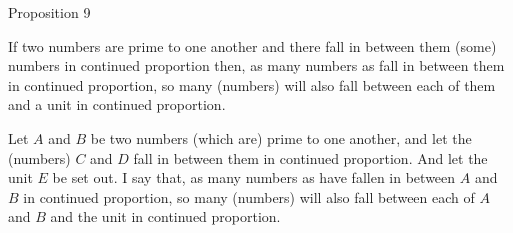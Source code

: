 
\begin{center}
{\large Proposition 9}
\end{center}

If two numbers are prime to one another and there fall  in  between them (some) numbers in continued proportion then,
as many numbers as fall in between them  in continued proportion, so many
(numbers) will also fall between each of them and a unit in continued proportion.

\epsfysize=2in
\centerline{}

Let $A$ and $B$ be two numbers (which are) prime to one another, and let the
(numbers) $C$ and $D$ fall in  between them in continued proportion. And let the unit $E$ be set out. I say that, as many numbers   as have fallen in between $A$ and $B$ in continued proportion, so many (numbers)  will also
fall between each of $A$ and $B$ and the unit in continued proportion.

